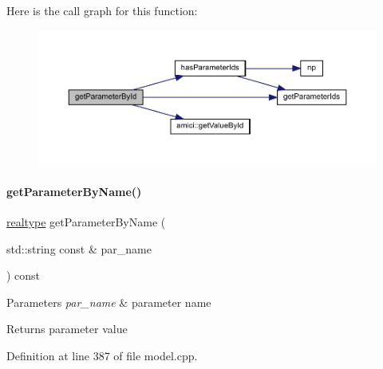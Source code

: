 Here is the call graph for this function\+:
\nopagebreak
\begin{figure}[H]
\begin{center}
\leavevmode
\includegraphics[width=350pt]{classamici_1_1_model_a4436bd89ae2cb032cbf13db478d99e15_cgraph}
\end{center}
\end{figure}
\mbox{\label{classamici_1_1_model_a19b349ca9793d45fda7ef8ea7422747a}} 
\paragraph{\texorpdfstring{get\+Parameter\+By\+Name()}{getParameterByName()}}
{\footnotesize\ttfamily \mbox{\hyperlink{namespaceamici_a1bdce28051d6a53868f7ccbf5f2c14a3}{realtype}} get\+Parameter\+By\+Name (\begin{DoxyParamCaption}\item[{std\+::string const \&}]{par\+\_\+name }\end{DoxyParamCaption}) const}


\begin{DoxyParams}{Parameters}
{\em par\+\_\+name} & parameter name \\
\hline
\end{DoxyParams}
\begin{DoxyReturn}{Returns}
parameter value 
\end{DoxyReturn}


Definition at line 387 of file model.\+cpp.

